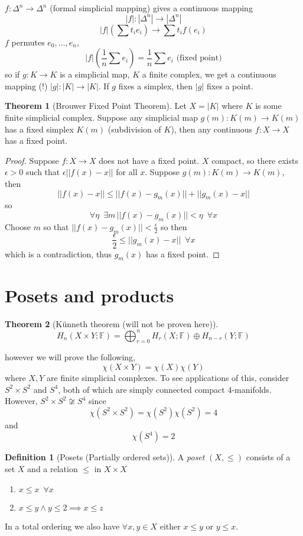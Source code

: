 \documentclass[a4paper,14pt]{extarticle}
\theoremstyle{definition}
\newtheorem*{theorem}{Theorem}
\newtheorem*{definition}{Definition}
\begin{document}
$f:\Delta^n\rightarrow \Delta^n$ (formal simplicial mapping) gives a continuous mapping
\[|f|:|\Delta^n|\rightarrow |\Delta^n|\]
\[|f|(\sum t_i e_i)\rightarrow \sum t_i f(e_i)\] $f$ permutes $e_0, \ldots, e_n$,
\[|f|(\frac{1}{n}\sum e_i) = \frac{1}{n}\sum e_i\text{ (fixed point)}\]
so if $g:K\rightarrow K$ is a simplicial map, $K$ a finite complex, we get a continuous
mapping (!) $|g|:|K|\rightarrow |K|$. If $g$ fixes a simplex, then 
$|g|$ fixes a point.

\begin{theorem}[Brouwer Fixed Point Theorem]
	Let $X=|K|$ where $K$ is some finite simplicial complex. Suppose any simplicial map 
	$g(m):K(m)\rightarrow K(m)$ has a fixed simplex $K(m)$ (subdivision of $K$), then any 
	continuous $f:X\rightarrow X$ has a fixed point.
\end{theorem}

\begin{proof}
	Suppose $f:X\rightarrow X$ does not have a fixed point. $X$ compact, so there exists 
	$\epsilon>0$ such that $\epsilon||f(x)-x||$ for all $x$. Suppose 
	$g(m):K(m)\rightarrow K(m)$, then 
	\[||f(x)-x||\leq||f(x)-g_m(x)||+||g_m(x)-x||\] so 
	\[\forall\eta\,\,\,\exists m \,||f(x)-g_m(x)||<\eta\,\,\,\forall x\]
	Choose $m$ so that $||f(x)-g_m(x)||<\frac{\epsilon}{2}$ so then 
	\[\frac{\epsilon}{2}\leq||g_m(x)-x||\,\,\,\forall x\] which is a contradiction, thus 
	$g_m(x)$ has a fixed point.
\end{proof}

\section{Posets and products}
\begin{theorem}[Künneth theorem (will not be proven here)]
	\[H_n(X\times Y;\mathbb{F})=\bigoplus_{r=0}^n H_r(X;\mathbb{F})\oplus H_{n-r}(Y;\mathbb{F})\]
\end{theorem}

however we will prove the following, 
\[\chi(X\times Y)=\chi(X)\chi(Y)\]
where $X,Y$ are finite simplicial complexes. To see applications of this, consider 
$S^2\times S^2$ and $S^4$, both of which are simply connected compact 4-manifolds. 
However, $S^2\times S^2\not\cong S^4$ since \[\chi(S^2\times S^2)=\chi(S^2)\chi(S^2)=4\]
and \[\chi(S^4)=2\]

\begin{definition}[Posets (Partially ordered sets)]
	A \emph{poset} $(X,\leq)$ consists of a set $X$ and a relation $\leq$ in $X\times X$
	\begin{enumerate}
		\item $x\leq x \,\,\,\forall x$
		\item $x\leq y\wedge y\leq 2\implies x\leq z$
	\end{enumerate}
	In a total ordering we also have $\forall x,y\in X$ either $x\leq y$ or $y\leq x$.
\end{definition}
\end{document}
